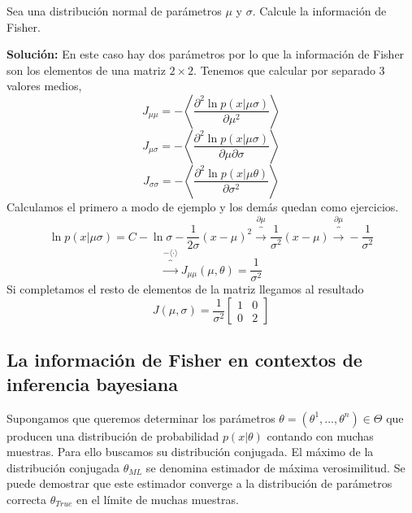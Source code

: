 \begin{example}
    Sea una distribuci\'on normal de par\'ametros $\mu$ y $\sigma$. Calcule la informaci\'on de Fisher.

    {\bf Soluci\'on:} En este caso hay dos par\'ametros por lo que la informaci\'on de Fisher son los elementos de una matriz $2\times 2$. Tenemos que calcular por separado 3 valores medios,
    $$
        J_{\mu\mu} = -\left\langle \frac{\partial^2 \ln p(x|\mu\sigma)}{\partial \mu^2} \right\rangle
    $$
    $$
        J_{\mu\sigma} = -\left\langle \frac{\partial^2 \ln p(x|\mu\sigma)}{\partial \mu\partial \sigma} \right\rangle
    $$
    $$
        J_{\sigma\sigma} = -\left\langle \frac{\partial^2 \ln p(x|\mu\theta)}{\partial \sigma^2} \right\rangle
    $$
    Calculamos el primero a modo de ejemplo y los dem\'as quedan como ejercicios.
    $$
        \ln p(x|\mu\sigma) = C -\ln \sigma -\frac{1}{2\sigma}(x-\mu)^2\overbrace{\to}^{\partial \mu} \frac{1}{\sigma^2}(x-\mu)\overbrace{\to}^{\partial \mu} -\frac{1}{\sigma^2}
    $$
    $$
    \overbrace{\to}^{-\langle\cdot\rangle} J_{\mu\mu}(\mu,\theta) = \frac{1}{\sigma^2}
    $$
    Si completamos el resto de elementos de la matriz llegamos al resultado
    \begin{equation}
        J(\mu,\sigma) = \frac{1}{\sigma^2}
        \left[\begin{matrix}
            1 & 0\\
            0 & 2
        \end{matrix}\right]
    \end{equation}
\end{example}

\subsection{La informaci\'on de Fisher en contextos de inferencia bayesiana}

Supongamos que queremos determinar los par\'ametros $\theta = (\theta^1,...,\theta^n)\in \Theta$ que producen una distribuci\'on de probabilidad $p(x|\theta)$ contando con muchas muestras. Para ello buscamos su distribuci\'on conjugada. El m\'aximo de la distribuci\'on conjugada $\theta_{ML}$ se denomina estimador de m\'axima verosimilitud. Se puede demostrar que este estimador converge a la distribuci\'on de par\'ametros correcta $\theta_{True}$ en el l\'imite de muchas muestras.


